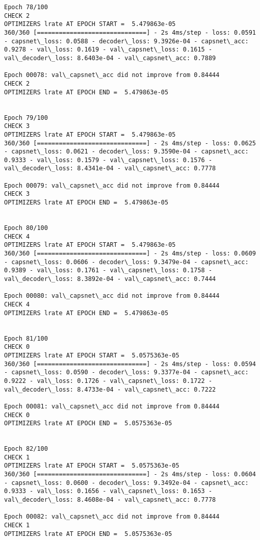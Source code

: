 \documentclass[11pt]{article}
\begin{document}
\begin{Verbatim}[commandchars=\\\{\}]
Epoch 78/100
CHECK 2
OPTIMIZERS lrate AT EPOCH START =  5.479863e-05
360/360 [==============================] - 2s 4ms/step - loss: 0.0591 - capsnet\_loss: 0.0588 - decoder\_loss: 9.3926e-04 - capsnet\_acc: 0.9278 - val\_loss: 0.1619 - val\_capsnet\_loss: 0.1615 - val\_decoder\_loss: 8.6403e-04 - val\_capsnet\_acc: 0.7889

Epoch 00078: val\_capsnet\_acc did not improve from 0.84444
CHECK 2
OPTIMIZERS lrate AT EPOCH END =  5.479863e-05 


Epoch 79/100
CHECK 3
OPTIMIZERS lrate AT EPOCH START =  5.479863e-05
360/360 [==============================] - 2s 4ms/step - loss: 0.0625 - capsnet\_loss: 0.0621 - decoder\_loss: 9.3590e-04 - capsnet\_acc: 0.9333 - val\_loss: 0.1579 - val\_capsnet\_loss: 0.1576 - val\_decoder\_loss: 8.4341e-04 - val\_capsnet\_acc: 0.7778

Epoch 00079: val\_capsnet\_acc did not improve from 0.84444
CHECK 3
OPTIMIZERS lrate AT EPOCH END =  5.479863e-05 


Epoch 80/100
CHECK 4
OPTIMIZERS lrate AT EPOCH START =  5.479863e-05
360/360 [==============================] - 2s 4ms/step - loss: 0.0609 - capsnet\_loss: 0.0606 - decoder\_loss: 9.3479e-04 - capsnet\_acc: 0.9389 - val\_loss: 0.1761 - val\_capsnet\_loss: 0.1758 - val\_decoder\_loss: 8.3892e-04 - val\_capsnet\_acc: 0.7444

Epoch 00080: val\_capsnet\_acc did not improve from 0.84444
CHECK 4
OPTIMIZERS lrate AT EPOCH END =  5.479863e-05 


Epoch 81/100
CHECK 0
OPTIMIZERS lrate AT EPOCH START =  5.0575363e-05
360/360 [==============================] - 2s 4ms/step - loss: 0.0594 - capsnet\_loss: 0.0590 - decoder\_loss: 9.3377e-04 - capsnet\_acc: 0.9222 - val\_loss: 0.1726 - val\_capsnet\_loss: 0.1722 - val\_decoder\_loss: 8.4733e-04 - val\_capsnet\_acc: 0.7222

Epoch 00081: val\_capsnet\_acc did not improve from 0.84444
CHECK 0
OPTIMIZERS lrate AT EPOCH END =  5.0575363e-05 


Epoch 82/100
CHECK 1
OPTIMIZERS lrate AT EPOCH START =  5.0575363e-05
360/360 [==============================] - 2s 4ms/step - loss: 0.0604 - capsnet\_loss: 0.0600 - decoder\_loss: 9.3492e-04 - capsnet\_acc: 0.9333 - val\_loss: 0.1656 - val\_capsnet\_loss: 0.1653 - val\_decoder\_loss: 8.4608e-04 - val\_capsnet\_acc: 0.7778

Epoch 00082: val\_capsnet\_acc did not improve from 0.84444
CHECK 1
OPTIMIZERS lrate AT EPOCH END =  5.0575363e-05 



\end{Verbatim}
\end{document}
